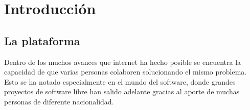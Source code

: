 
\chapter{Introducción} %

\label{Chapter1} %


\newcommand{\keyword}[1]{\textbf{#1}}
\newcommand{\tabhead}[1]{\textbf{#1}}
\newcommand{\code}[1]{\texttt{#1}}
\newcommand{\file}[1]{\texttt{\bfseries#1}}
\newcommand{\option}[1]{\texttt{\itshape#1}}


\section{La plataforma}

Dentro de los muchos avances que internet ha hecho posible se encuentra la
capacidad de que varias personas colaboren solucionando el mismo problema. Esto
se ha notado especialmente en el mundo del software, donde grandes proyectos de
software libre han salido adelante gracias al aporte de muchas personas de
diferente nacionalidad.




